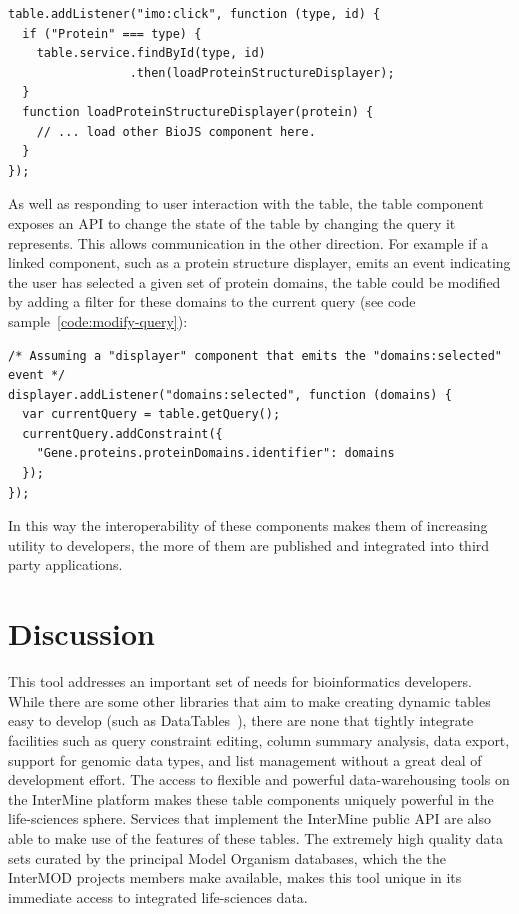 \documentclass[10pt,a4paper,twocolumn]{article}
\begin{document}
\begin{lstlisting}[caption={Integrating with Other Components - Example 1}, label={code:integration}]
table.addListener("imo:click", function (type, id) {
  if ("Protein" === type) {
    table.service.findById(type, id)
                 .then(loadProteinStructureDisplayer);
  }
  function loadProteinStructureDisplayer(protein) {
    // ... load other BioJS component here.
  }
});
\end{lstlisting}

As well as responding to user interaction with the table, the table component
exposes an API to change the state of the table by changing the query it
represents. This allows communication in the other direction. For example if a
linked component, such as a protein structure displayer, emits an event
indicating the user has selected a given set of protein domains, the table could
be modified by adding a filter for these domains to the current query (see code
sample~\ref{code:modify-query}):

\begin{lstlisting}[caption={Integrating with Other Components - Example 2}, label={code:modify-query}]
/* Assuming a "displayer" component that emits the "domains:selected" event */
displayer.addListener("domains:selected", function (domains) {
  var currentQuery = table.getQuery();
  currentQuery.addConstraint({
    "Gene.proteins.proteinDomains.identifier": domains
  });
});
\end{lstlisting}

In this way the interoperability of these components makes them of increasing
utility to developers, the more of them are published and integrated into third
party applications.

\section*{Discussion}

This tool addresses an important set of needs for bioinformatics developers.
While there are some other libraries that aim to make creating dynamic tables
easy to develop (such as DataTables~\cite{site:datatables}), there are none that
tightly integrate facilities such as query constraint editing, column summary
analysis, data export, support for genomic data types, and list management
without a great deal of development effort. The access to flexible and powerful
data-warehousing tools on the InterMine platform makes these table components
uniquely powerful in the life-sciences sphere. Services that implement the
InterMine public API are also able to make use of the features of these tables.
The extremely high quality data sets curated by the principal Model Organism
databases, which the the InterMOD projects members make available, makes this
tool unique in its immediate access to integrated life-sciences data. 
\end{document}
